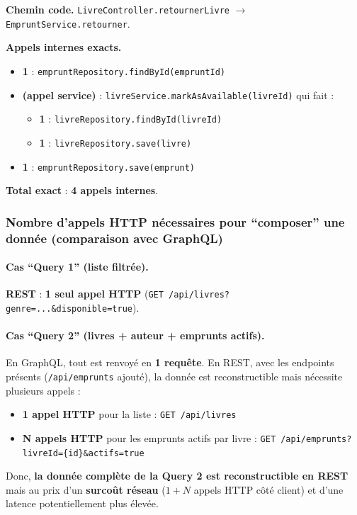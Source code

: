 \textbf{Chemin code.} \texttt{LivreController.retournerLivre} $\rightarrow$ \texttt{EmpruntService.retourner}.

\textbf{Appels internes exacts.}
\begin{itemize}[leftmargin=1.5cm]
  \item \textbf{1} : \texttt{empruntRepository.findById(empruntId)}
  \item \textbf{(appel service)} : \texttt{livreService.markAsAvailable(livreId)} qui fait :
    \begin{itemize}[leftmargin=1.5cm]
      \item \textbf{1} : \texttt{livreRepository.findById(livreId)}
      \item \textbf{1} : \texttt{livreRepository.save(livre)}
    \end{itemize}
  \item \textbf{1} : \texttt{empruntRepository.save(emprunt)}
\end{itemize}

\textbf{Total exact} : \textbf{4 appels internes}.

\subsubsection{Nombre d'appels HTTP nécessaires pour ``composer'' une donnée (comparaison avec GraphQL)}
\paragraph{Cas ``Query 1'' (liste filtrée).}
\textbf{REST} : \textbf{1 seul appel HTTP} (\texttt{GET /api/livres?genre=...&disponible=true}).

\paragraph{Cas ``Query 2'' (livres + auteur + emprunts actifs).}
En GraphQL, tout est renvoyé en \textbf{1 requête}. En REST, avec les endpoints présents (\texttt{/api/emprunts} ajouté), la donnée est reconstructible mais nécessite plusieurs appels :
\begin{itemize}[leftmargin=1.5cm]
  \item \textbf{1 appel HTTP} pour la liste : \texttt{GET /api/livres}
  \item \textbf{N appels HTTP} pour les emprunts actifs par livre :
  \texttt{GET /api/emprunts?livreId=\{id\}\&actifs=true}
\end{itemize}
Donc, \textbf{la donnée complète de la Query 2 est reconstructible en REST} mais au prix d'un \textbf{surcoût réseau} (\(1 + N\) appels HTTP côté client) et d'une latence potentiellement plus élevée.

